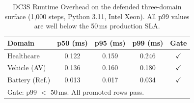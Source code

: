 \begin{table}[htbp]
\centering
\caption{DC3S Runtime Overhead on the defended three-domain surface (1{,}000 steps, Python 3.11, Intel Xeon). All p99 values are well below the 50\,ms production SLA.}
\label{tbl:latency_benchmark}
\begin{tabular}{lcccc}
\toprule
\textbf{Domain} & \textbf{p50 (ms)} & \textbf{p95 (ms)} & \textbf{p99 (ms)} & \textbf{Gate} \\
\midrule
Healthcare & 0.122 & 0.159 & 0.246 & $\checkmark$ \\
Vehicle (AV) & 0.136 & 0.160 & 0.180 & $\checkmark$ \\
Battery (Ref.) & 0.013 & 0.017 & 0.034 & $\checkmark$ \\
\bottomrule
\multicolumn{5}{l}{\small Gate: p99 $<$ 50\,ms. All promoted rows pass.}\\
\end{tabular}
\end{table}
